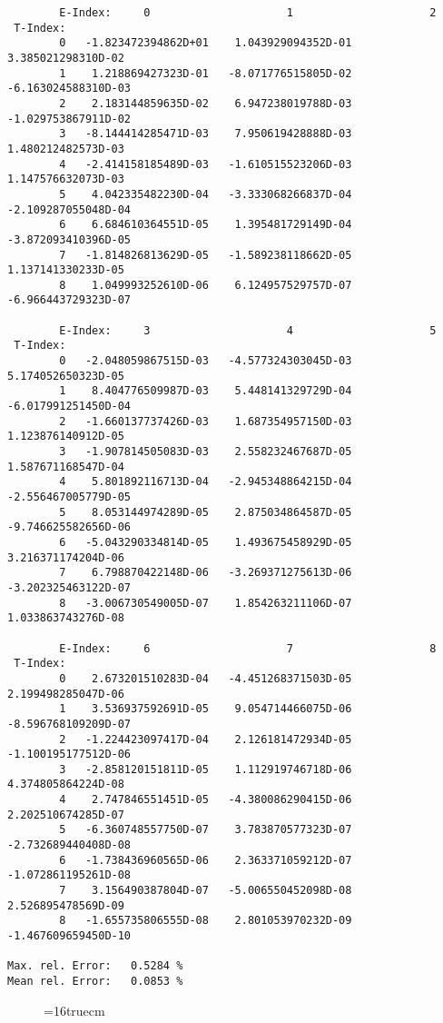 \documentclass[12pt,dvipdfmx]{article}
\begin{document}
\begin{small}\begin{verbatim}
        E-Index:     0                     1                     2
 T-Index:
        0   -1.823472394862D+01    1.043929094352D-01    3.385021298310D-02
        1    1.218869427323D-01   -8.071776515805D-02   -6.163024588310D-03
        2    2.183144859635D-02    6.947238019788D-03   -1.029753867911D-02
        3   -8.144414285471D-03    7.950619428888D-03    1.480212482573D-03
        4   -2.414158185489D-03   -1.610515523206D-03    1.147576632073D-03
        5    4.042335482230D-04   -3.333068266837D-04   -2.109287055048D-04
        6    6.684610364551D-05    1.395481729149D-04   -3.872093410396D-05
        7   -1.814826813629D-05   -1.589238118662D-05    1.137141330233D-05
        8    1.049993252610D-06    6.124957529757D-07   -6.966443729323D-07

        E-Index:     3                     4                     5
 T-Index:
        0   -2.048059867515D-03   -4.577324303045D-03    5.174052650323D-05
        1    8.404776509987D-03    5.448141329729D-04   -6.017991251450D-04
        2   -1.660137737426D-03    1.687354957150D-03    1.123876140912D-05
        3   -1.907814505083D-03    2.558232467687D-05    1.587671168547D-04
        4    5.801892116713D-04   -2.945348864215D-04   -2.556467005779D-05
        5    8.053144974289D-05    2.875034864587D-05   -9.746625582656D-06
        6   -5.043290334814D-05    1.493675458929D-05    3.216371174204D-06
        7    6.798870422148D-06   -3.269371275613D-06   -3.202325463122D-07
        8   -3.006730549005D-07    1.854263211106D-07    1.033863743276D-08

        E-Index:     6                     7                     8
 T-Index:
        0    2.673201510283D-04   -4.451268371503D-05    2.199498285047D-06
        1    3.536937592691D-05    9.054714466075D-06   -8.596768109209D-07
        2   -1.224423097417D-04    2.126181472934D-05   -1.100195177512D-06
        3   -2.858120151811D-05    1.112919746718D-06    4.374805864224D-08
        4    2.747846551451D-05   -4.380086290415D-06    2.202510674285D-07
        5   -6.360748557750D-07    3.783870577323D-07   -2.732689440408D-08
        6   -1.738436960565D-06    2.363371059212D-07   -1.072861195261D-08
        7    3.156490387804D-07   -5.006550452098D-08    2.526895478569D-09
        8   -1.655735806555D-08    2.801053970232D-09   -1.467609659450D-10

Max. rel. Error:   0.5284 %
Mean rel. Error:   0.0853 %
\end{verbatim}\end{small}
\begin{figure} \label{0.1T}
\epsfxsize=16truecm
\end{figure}
\newpage
\end{document}
